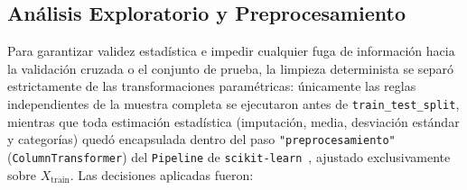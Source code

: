 \documentclass[conference]{IEEEtran}
\begin{document}
\subsection{Análisis Exploratorio y Preprocesamiento}

Para garantizar validez estadística e impedir cualquier fuga de información hacia la validación cruzada o el conjunto de prueba, la limpieza determinista se separó estrictamente de las transformaciones paramétricas: únicamente las reglas independientes de la muestra completa se ejecutaron antes de \texttt{train\_test\_split}, mientras que toda estimación estadística (imputación, media, desviación estándar y categorías) quedó encapsulada dentro del paso \texttt{"preprocesamiento"} (\texttt{ColumnTransformer}) del \texttt{Pipeline} de \texttt{scikit-learn}~\cite{pedregosa2011scikit}, ajustado exclusivamente sobre $X_{\text{train}}$. Las decisiones aplicadas fueron:
\end{document}
